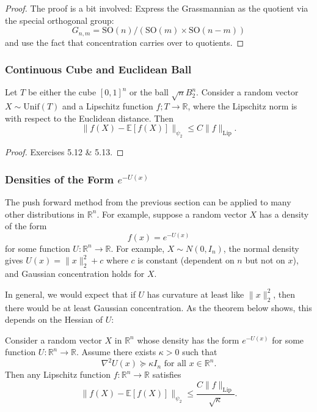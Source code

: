 \begin{proof}
The proof is a bit involved: Express the Grassmannian as the quotient via the special orthogonal group:
\[ G_{n, m} = \mathrm{SO}(n) / (\mathrm{SO}(m) \times \mathrm{SO}(n - m)) \]
and use the fact that concentration carries over to quotients.
\end{proof}


\subsubsection{Continuous Cube and Euclidean Ball}
\begin{theorem}
\label{thm:5.2.10}
Let $T$ be either the cube $[0, 1]^n$ or the ball $\sqrt{n}B_2^n$. Consider a random vector $X \sim 
\mathrm{Unif}(T)$ and a Lipschitz function $f; T \to \mathbb{R}$, where the Lipschitz norm is with respect 
to the Euclidean distance. Then 
\[ \lVert f(X) - \mathbb{E}[f(X)] \rVert_{\psi_2} \leq C \lVert f \rVert_{\mathrm{Lip}}. \]
\end{theorem}

\begin{proof}
Exercises 5.12 \& 5.13.
\end{proof}


\subsubsection{Densities of the Form \texorpdfstring{$e^{-U(x)}$}{}}
The push forward method from the previous section can be applied to many other distributions in $\mathbb{R}^n$. 
For example, suppose a random vector $X$ has a density of the form
\[ f(x) = e^{-U(x)} \]
for some function $U: \mathbb{R}^n \to \mathbb{R}$. For example, $X \sim N(0, I_n)$, the normal density gives 
$U(x) = \lVert x \rVert_{2}^2 + c$ where $c$ is constant (dependent on $n$ but not on $x$), and Gaussian 
concentration holds for $X$.

In general, we would expect that if $U$ has curvature at least like $\lVert x \rVert_{2}^2$, then there would be 
at least Gaussian concentration. As the theorem below shows, this depends on the Hessian of $U$:

\begin{theorem}[]
\label{thm:5.2.11}
Consider a random vector $X$ in $\mathbb{R}^n$ whose density has the form $e^{-U(x)}$ for some function 
$U: \mathbb{R}^n \to \mathbb{R}$. Assume there exists $\kappa > 0$ such that 
\[ \nabla^2 U(x) \succcurlyeq \kappa I_n \text{ for all } x \in \mathbb{R}^n. \]
Then any Lipschitz function $f: \mathbb{R}^n \to \mathbb{R}$ satisfies
\[ \lVert f(X) - \mathbb{E}[f(X)] \rVert_{\psi_2} \leq \frac{C \lVert f \rVert_{\mathrm{Lip}}}{\sqrt{\kappa}}. \]
\end{theorem}

